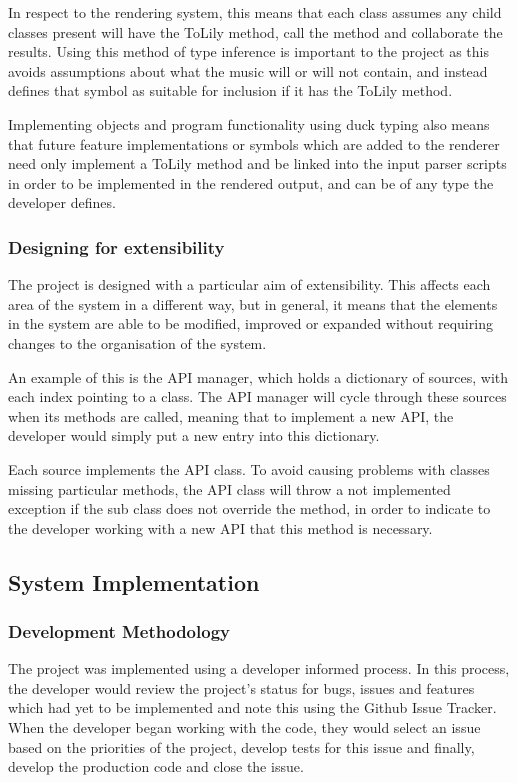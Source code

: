 In respect to the rendering system, this means that each class assumes any child classes present will have the ToLily method, call the method and collaborate the results. Using this method of type inference is important to the project as this avoids assumptions about what the music will or will not contain, and instead defines that symbol as suitable for inclusion if it has the ToLily method. 

Implementing objects and program functionality using duck typing also means that future feature implementations or symbols which are added to the renderer need only implement a ToLily method and be linked into the input parser scripts in order to be implemented in the rendered output, and can be of any type the developer defines.

\subsubsection{Designing for extensibility}
The project is designed with a particular aim of extensibility. This affects each area of the system in a different way, but in general, it means that the elements in the system are able to be modified, improved or expanded without requiring changes to the organisation of the system. 

An example of this is the API manager, which holds a dictionary of sources, with each index pointing to a class. The API manager will cycle through these sources when its methods are called, meaning that to implement a new API, the developer would simply put a new entry into this dictionary.

Each source implements the API class. To avoid causing problems with classes missing particular methods, the API class will throw a not implemented exception if the sub class does not override the method, in order to indicate to the developer working with a new API that this method is necessary.


\subsection{System Implementation}
\subsubsection{Development Methodology}
The project was implemented using a developer informed process. In this process, the developer would review the project's status for bugs, issues and features which had yet to be implemented and note this using the Github Issue Tracker. When the developer began working with the code, they would select an issue based on the priorities of the project, develop tests for this issue and finally, develop the production code and close the issue.


